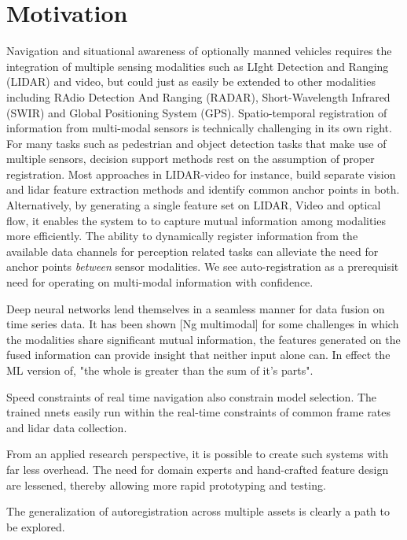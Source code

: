 \documentclass{article}
\begin{document}
\section{Motivation} %
\label{sec:motivation}
Navigation and situational awareness of optionally manned vehicles requires the integration of multiple sensing modalities such as LIght Detection and Ranging (LIDAR) and video, but could just as easily be extended to other modalities including RAdio Detection And Ranging (RADAR), Short-Wavelength Infrared (SWIR) and Global Positioning System (GPS). Spatio-temporal registration of information from multi-modal sensors is technically challenging in its own right. For many tasks such as pedestrian and object detection tasks that make use of multiple sensors, decision support methods rest on the assumption of proper registration. Most approaches \cite{Bodensteiner2012Real-time-} in LIDAR-video for instance, build separate vision and lidar feature extraction methods and identify common anchor points in both. Alternatively, by generating a single feature set on LIDAR, Video and optical flow, it enables the system to to capture mutual information among modalities more efficiently. The ability to dynamically register information from the available data channels for perception related tasks can alleviate the need for anchor points \emph{between} sensor modalities. We see auto-registration as a prerequisit need for operating on multi-modal information with confidence.

Deep neural networks lend themselves in a seamless manner for data fusion on time series data. It has been shown [Ng multimodal] for some challenges in which the modalities share significant mutual information, the features generated on the fused information can provide insight that neither input alone can. In effect the ML version of, "the whole is greater than the sum of it's parts". 

Speed constraints of real time navigation also constrain model selection. The trained nnets easily run within the real-time constraints of common frame rates and lidar data collection.

From an applied research perspective, it is possible to create such systems with far less overhead. The need for domain experts and hand-crafted feature design are lessened, thereby allowing more rapid prototyping and testing. 

The generalization of autoregistration across multiple assets is clearly a path to be explored. 
\end{document}
